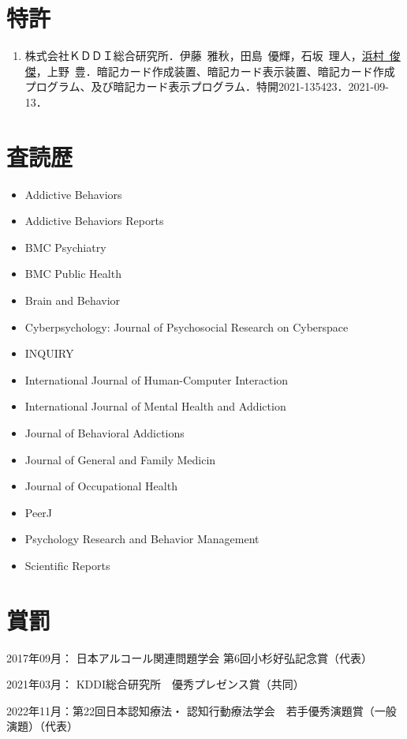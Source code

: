 \documentclass[11pt,a4paper]{article}
\begin{document}
\section{特許}
\begin{enumerate}
	\item 株式会社ＫＤＤＩ総合研究所．伊藤\ 雅秋，田島\ 優輝，石坂\ 理人，\underline{浜村\ 俊傑}，上野\ 豊．暗記カード作成装置、暗記カード表示装置、暗記カード作成プログラム、及び暗記カード表示プログラム．特開2021-135423．2021-09-13．
\end{enumerate}

\section{査読歴}
	\begin{itemize}
	\item Addictive Behaviors
	\item Addictive Behaviors Reports
	\item BMC Psychiatry
	\item BMC Public Health
	\item Brain and Behavior
	\item Cyberpsychology: Journal of Psychosocial Research on Cyberspace 
	\item INQUIRY
	\item International Journal of Human-Computer Interaction
	\item International Journal of Mental Health and Addiction
	\item Journal of Behavioral Addictions
	\item Journal of General and Family Medicin
	\item Journal of Occupational Health
	\item PeerJ
	\item Psychology Research and Behavior Management 
	\item Scientific Reports
\end{itemize}
\section{賞罰}
\begin{description}
	\item 2017年09月： 日本アルコール関連問題学会 第6回小杉好弘記念賞（代表）
	\item 2021年03月： KDDI総合研究所　優秀プレゼンス賞（共同）
	\item 2022年11月：第22回日本認知療法・	認知行動療法学会　若手優秀演題賞（一般演題）（代表）
\end{description}
\end{document}
